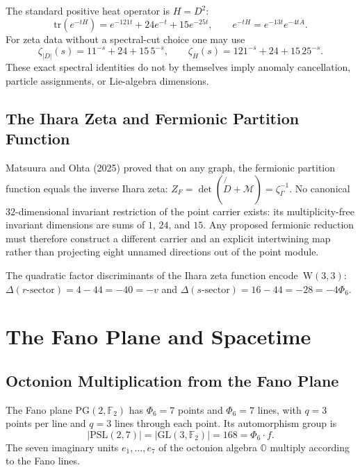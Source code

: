 \documentclass[12pt,a4paper]{article}
\newcommand{\W}{\mathrm{W}(3,3)}
\begin{document}
The standard positive heat operator is $H=D^2$:
\[
  \mathrm{tr}(e^{-tH})=e^{-121t}+24e^{-t}+15e^{-25t},
  \qquad
  e^{-tH}=e^{-13t}e^{-4t\overline A}.
\]
For zeta data without a spectral-cut choice one may use
\[
  \zeta_{|D|}(s)=11^{-s}+24+15\,5^{-s},\qquad
  \zeta_H(s)=121^{-s}+24+15\,25^{-s}.
\]
These exact spectral identities do not by themselves imply anomaly
cancellation, particle assignments, or Lie-algebra dimensions.

\subsection{The Ihara Zeta and Fermionic Partition Function}

Matsuura and Ohta (2025) proved that on any graph, the fermionic
partition function equals the inverse Ihara zeta:
$Z_F = \det(\not{D}+\mathcal{M}) = \zeta_\Gamma^{-1}$.
No canonical $32$-dimensional invariant restriction of the point carrier
exists: its multiplicity-free invariant dimensions are sums of
$1$, $24$, and $15$.  Any proposed fermionic reduction must therefore
construct a different carrier and an explicit intertwining map rather than
projecting eight unnamed directions out of the point module.

The quadratic factor discriminants of the Ihara zeta function encode~$\W$:
$\Delta(r\text{-sector}) = 4-44 = -40 = -v$ and
$\Delta(s\text{-sector}) = 16-44 = -28 = -4\Phi_6$.


\section{The Fano Plane and Spacetime}
\label{sec:fano}

\subsection{Octonion Multiplication from the Fano Plane}

The Fano plane $\mathrm{PG}(2,\mathbb{F}_2)$ has $\Phi_6=7$ points and
$\Phi_6=7$ lines, with $q=3$ points per line and $q=3$ lines through each point.
Its automorphism group is
\begin{equation}\label{eq:psl27}
  |\mathrm{PSL}(2,7)| = |\mathrm{GL}(3,\mathbb{F}_2)| = 168 = \Phi_6\cdot f.
\end{equation}
The seven imaginary units $e_1,\ldots,e_7$ of the octonion algebra $\mathbb{O}$
multiply according to the Fano lines.
\end{document}
